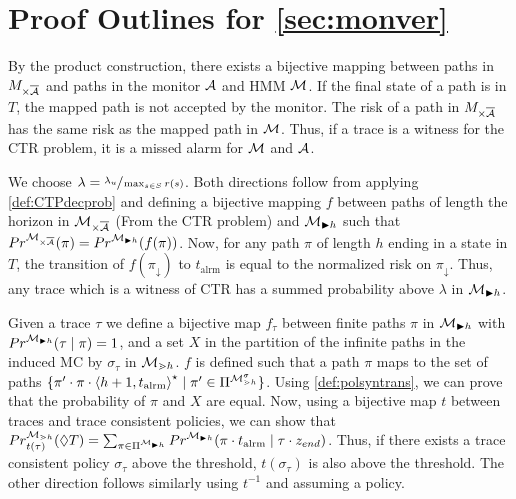 \documentclass[runningheads]{llncs}
\newcommand{\appcite}[2]{#2} %
\newcommand{\talrm}{t_{\text{alrm}}}
\newcommand{\en}{z_{\color{black} end}\xspace}
\newcommand{\alarms}[1][h+1]{\left\langle #1, \talrm\right\rangle}
\begin{document}
\clearpage


\clearpage

\appcite{}{
\appendix
{}
\crefalias{subsection}{appsec}

\section{Proof Outlines for \cref{sec:monver}}\label{app:proofs}
\toctp*
\begin{proofoutline}
    By the product construction, there exists a bijective mapping between paths in $M_{\times\overline{\mathcal{A}}}$ and paths in the monitor $\mathcal{A}$ and HMM $\mathcal{M}$. If the final state of a path is in $T$, the mapped path is not accepted by the monitor. The risk of a path in $M_{\times\overline{\mathcal{A}}}$ has the same risk as the mapped path in $\mathcal{M}$. Thus, if a trace is a witness for the CTR problem, it is a missed alarm for $\mathcal{M}$ and $\mathcal{A}$.
\end{proofoutline}

\toactp*
\begin{proofoutline}
    We choose $\lambda = \sfrac{\lambda_u}{\max_{s\in S}r(s)}$. Both directions follow from applying \cref{def:CTPdecprob} and defining a bijective mapping $f$ between paths of length the horizon in $\mathcal{M}_{\times\overline{\mathcal{A}}}$ (From the CTR problem) and $\mathcal{M}_{\blacktriangleright h}$ such that ${Pr}^{\mathcal{M}_{\times\overline{\mathcal{A}}}}(\pi) = {Pr}^{\mathcal{M}_{\blacktriangleright h}}(f(\pi))$. Now, for any path $\pi$ of length $h$ ending in a state in $T$, the transition of $f(\pi_\downarrow)$ to $\talrm$ is equal to the normalized risk on $\pi_\downarrow$.
    Thus, any trace which is a witness of CTR has a summed probability above $\lambda$ in $\mathcal{M}_{\blacktriangleright h}$.
\end{proofoutline}

\tocoloredmdp*
\begin{proofoutline}
    Given a trace $\tau$ we define a bijective map $f_\tau$ between finite paths $\pi$ in $\mathcal{M}_{\blacktriangleright h}$ with ${Pr}^{\mathcal{M}_{\blacktriangleright h}}(\tau\mid\pi) = 1$, and a set $X$ in the partition of the infinite paths in the induced MC by $\sigma_\tau$ in $\mathcal{M}_{\gtrdot h}$. $f$ is defined such that a path $\pi$ maps to the set of paths $\{\pi'\cdot\pi\cdot\alarms^\star\mid\pi'\in\Pi^{\mdp_{\gtrdot h}^\sigma}\}$. Using \cref{def:polsyntrans}, we can prove that the probability of $\pi$ and $X$ are equal. Now, using a bijective map $t$ between traces and trace consistent policies, we can show that $\Prob^{\mdp_{\gtrdot h}}_{t(\tau)}(\lozenge T) = \sum_{\pi\in\Pi^{\mc_{\blacktriangleright h}}}\Prob^{\mc_{\blacktriangleright h}}(\pi \cdot \talrm \mid \tau \cdot \en)$. Thus, if there exists a trace consistent policy $\sigma_\tau$ above the threshold, $t(\sigma_\tau)$ is also above the threshold.
    The other direction follows similarly using $t^{-1}$ and assuming a policy.
\end{proofoutline}

}
\end{document}
